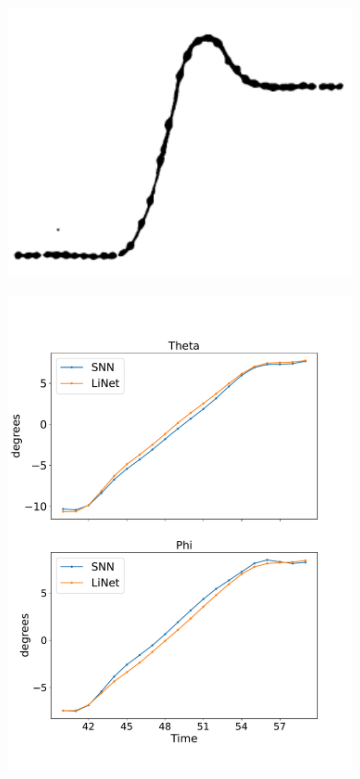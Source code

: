 \documentclass [MS] {UCLAthesis}
\begin{document}
\begin{figure}
    \centering

    \begin{subfigure}{0.2\textwidth}
        \centering
        \includegraphics[width=\textwidth]{saccade_human_ori}
        \caption{}
        \label{fig:saccade_human_ori}
    \end{subfigure}
    \hfill
    \begin{subfigure}{0.2\textwidth}
        \centering
        \includegraphics[width=\textwidth]{saccade_human_ori_normal}

\end{subfigure}
\end{figure}
\end{document}

